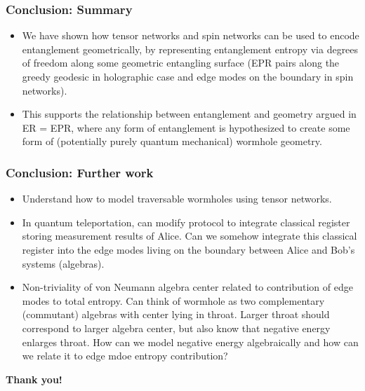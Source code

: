 \documentclass[11pt]{beamer}
\newcommand{\vs}{\vskip10pt}
\begin{document}
\begin{frame}
	
	\frametitle{Conclusion: Summary}
	
	\begin{itemize}
		
		
		\item We have shown how tensor networks and spin networks can be used to encode entanglement geometrically, by representing entanglement entropy via degrees of freedom along some geometric entangling surface (EPR pairs along the greedy geodesic in holographic case and edge modes on the boundary in spin networks). 
		
		\item This supports the relationship between entanglement and geometry argued in ER = EPR, where any form of entanglement is hypothesized to create some form of (potentially purely quantum mechanical) wormhole geometry.
		
		
		
	\end{itemize}
	
\end{frame}

\begin{frame}
	
	\frametitle{Conclusion: Further work}
	
	\begin{itemize}
		
		\item Understand how to model traversable wormholes using tensor networks.
		\item In quantum teleportation, can modify protocol to integrate classical register storing measurement results of Alice. Can we somehow integrate this classical register into the edge modes living on the boundary between Alice and Bob's systems (algebras). 
		\item Non-triviality of von Neumann algebra center related to contribution of edge modes to total entropy. Can think of wormhole as two complementary (commutant) algebras with center lying in throat. Larger throat should correspond to larger algebra center, but also know that negative energy enlarges throat. How can we model negative energy algebraically and how can we relate it to edge mdoe entropy contribution?
		
	\end{itemize}
	
\end{frame}

\begin{frame}
	
\vs
\vs
\vs
\vs
\begin{center}\textbf{\Large{Thank you!}}\end{center}
	
	
\end{frame}
\end{document}
